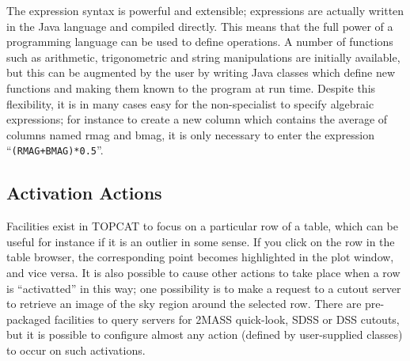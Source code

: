 \documentclass[11pt,twoside]{article}  %
\begin{document}
The expression syntax is powerful and extensible; expressions are
actually written in the Java language and compiled directly.
This means that the full power of a programming language can be
used to define operations.  A number of functions such as arithmetic,
trigonometric and string manipulations are initially available,
but this can be augmented by the user by writing Java
classes which define new functions and making them known to the program
at run time.  Despite this flexibility, it is in many cases easy for
the non-specialist to specify algebraic expressions; 
for instance to create a new column which contains the average
of columns named {\sc rmag} and {\sc bmag}, it is only necessary to enter the
expression ``{\tt (RMAG+BMAG)*0.5}''.

\subsection{Activation Actions}

Facilities exist in TOPCAT to focus on a particular row of a table,
which can be useful for instance if it is an outlier in some sense.
If you click on the row in the table browser, the corresponding point
becomes highlighted in the plot window, and vice versa.
It is also possible to cause other actions to take place when a row
is ``activatted'' in this way; one possibility is to make a request to a
cutout server to retrieve an image of the sky region around
the selected row.  There are pre-packaged facilities to query 
servers for 2MASS quick-look, SDSS or DSS cutouts, but it is possible
to configure almost any action (defined by user-supplied classes)
to occur on such activations.
\end{document}
